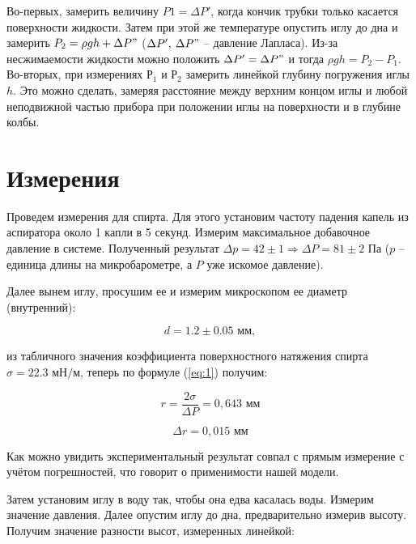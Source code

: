\documentclass[a4paper, 12pt]{article} %
\begin{document}
Во-первых, замерить величину $P1 = \Delta P'$, когда кончик трубки только касается поверхности жидкости. Затем при этой же температуре опустить иглу до дна и замерить $P_2 = \rho gh + \Delta P"$ ($\Delta P' ,\: \Delta P"$ – давление Лапласа). Из-за несжимаемости жидкости можно положить $\Delta P' = \Delta P"$ и тогда $\rho gh = P_2 -P_1$. Во-вторых, при измерениях $Р_1$ и $Р_2$ замерить линейкой глубину погружения иглы $h$. Это можно сделать, замеряя расстояние между верхним концом иглы и любой неподвижной частью прибора при положении иглы на поверхности и в глубине колбы.

\section{Измерения}

Проведем измерения для спирта. Для этого установим частоту падения капель из аспиратора около 1 капли в 5 секунд. Измерим максимальное добавочное давление в системе. Полученный результат $\Delta p = 42 \pm 1 \Rightarrow \Delta P = 81 \pm 2$ Па ($p$ -- единица длины на микробарометре, а $P$ уже искомое давление).

\bigskip

Далее вынем иглу, просушим ее и измерим микроскопом ее диаметр (внутренний):

\begin{equation}
    d = 1.2 \pm 0.05 \text{ мм},
\label{eq:2}
\end{equation}

из табличного значения коэффициента поверхностного натяжения спирта $\sigma = 22.3 \text{ мН/м}$, теперь по формуле (\ref{eq:1}) получим:

\begin{equation}
    r = \frac{2\sigma}{\Delta P} = 0,643 \text{ мм}
\end{equation}

\begin{equation}
    \Delta r = 0,015 \text{ мм}
\end{equation}

Как можно увидить экспериментальный результат совпал с прямым измерение с учётом погрешностей, что говорит о применимости нашей модели.

\bigskip

Затем установим иглу в воду так, чтобы она едва касалась воды. Измерим значение давления. Далее опустим иглу до дна, предварительно измерив высоту. Получим значение разности высот, измеренных линейкой:
\end{document}
